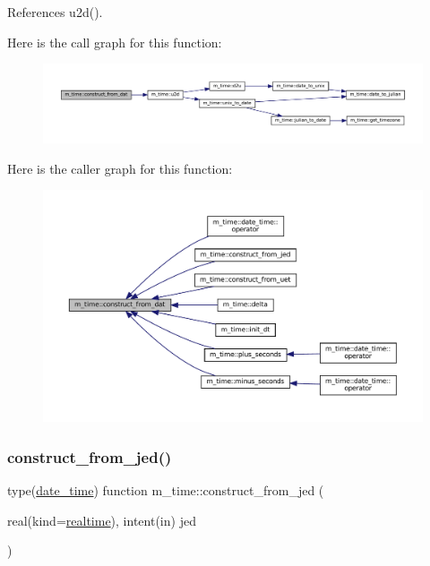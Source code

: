 References u2d().

Here is the call graph for this function\+:\nopagebreak
\begin{figure}[H]
\begin{center}
\leavevmode
\includegraphics[width=350pt]{namespacem__time_a6f7d20403f29656febb82306aa064134_cgraph}
\end{center}
\end{figure}
Here is the caller graph for this function\+:\nopagebreak
\begin{figure}[H]
\begin{center}
\leavevmode
\includegraphics[width=350pt]{namespacem__time_a6f7d20403f29656febb82306aa064134_icgraph}
\end{center}
\end{figure}
\mbox{\label{namespacem__time_ab7b679d14dabc2a9250f4ec218569f0c}} 
\subsubsection{\texorpdfstring{construct\+\_\+from\+\_\+jed()}{construct\_from\_jed()}}
{\footnotesize\ttfamily type(\mbox{\hyperlink{structm__time_1_1date__time}{date\+\_\+time}}) function m\+\_\+time\+::construct\+\_\+from\+\_\+jed (\begin{DoxyParamCaption}\item[{real(kind=\mbox{\hyperlink{namespacem__time_ac10ea9e8d59ec74eaa7d89f2517d7422}{realtime}}), intent(in)}]{jed }\end{DoxyParamCaption})\hspace{0.3cm}{\ttfamily [private]}}



